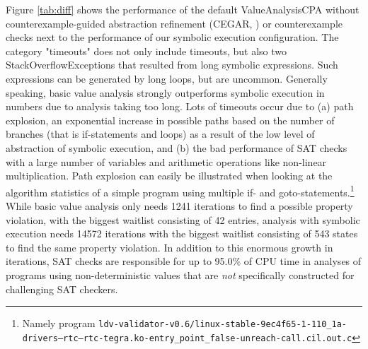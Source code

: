 Figure \ref{tab:diff} shows the performance of the default ValueAnalysisCPA without counterexample-guided abstraction refinement (CEGAR, \cite{Beyer2013}) or counterexample checks next to the performance of our symbolic execution configuration. The category "timeouts" does not only include timeouts, but also two StackOverflowExceptions that resulted from long symbolic expressions. Such expressions can be generated by long loops, but are uncommon.
Generally speaking, basic value analysis strongly outperforms symbolic execution in numbers due to analysis taking too long.
Lots of timeouts occur due to
(a) path explosion, an exponential increase in possible paths based on the number of branches (that is if-statements and loops) as a result of the low level of abstraction of symbolic execution, and
(b) the bad performance of SAT checks with a large number of variables and arithmetic operations like non-linear multiplication.
Path explosion can easily be illustrated when looking at the algorithm statistics of a simple program using multiple if- and goto-statements.\footnote{Namely program \texttt{ldv-validator-v0.6/linux-stable-9ec4f65-1-110\_1a-drivers--rtc--rtc-tegra.ko-entry\_point\_false-unreach-call.cil.out.c}}
While basic value analysis only needs 1241 iterations to find a possible property violation, with the biggest waitlist consisting of 42 entries,
analysis with symbolic execution needs 14572 iterations with the biggest waitlist consisting of 543 states to find the same property violation.
In addition to this enormous growth in iterations, SAT checks are responsible for up to 95.0\% of CPU time in analyses of programs using non-deterministic values that are \emph{not} specifically constructed for challenging SAT checkers.

